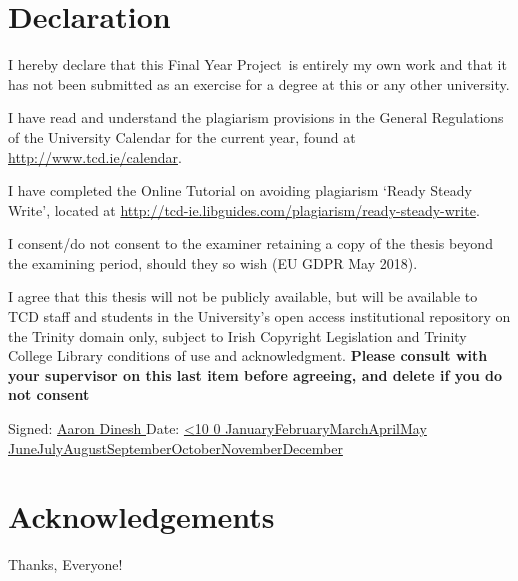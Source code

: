 \documentclass[a4paper,oneside,12pt]{book}
\title{\thesistitle}
\author{\authorname}
\newcommand{\typeofthesis}{Final Year Project} %
\numberwithin{equation}{chapter} %
\renewcommand{\today}{\ifnum\number\day<10 0\fi \number\day \space%
\ifcase \month \or January\or February\or March\or April\or May%
\or June\or July\or August\or September\or October\or November\or December\fi \space%
\number \year}
\begin{document}

\section*{\Huge\textcolor{tcd_blue}{Declaration}}
\vspace{1cm}
I hereby declare that this \typeofthesis\ is entirely my own work and that it has not been submitted as an exercise for
a degree at this or any other university.

\vspace{1cm}
I have read and understand the plagiarism provisions in the General Regulations of the University Calendar for the
current year, found at \url{http://www.tcd.ie/calendar}.
\vspace{1cm}

I have completed the Online Tutorial on avoiding plagiarism `Ready Steady Write', located at
\url{http://tcd-ie.libguides.com/plagiarism/ready-steady-write}.
\vspace{1cm}

I consent/do not consent to the examiner retaining a copy of the thesis beyond the examining period, should they so
wish (EU GDPR May 2018).
\vspace{1cm}

I agree that this thesis will not be publicly available, but will be available to TCD staff and students in the
University’s open access institutional repository on the Trinity domain only, subject to Irish Copyright Legislation and
Trinity College Library conditions of use and acknowledgment.  \textbf{Please consult with your supervisor on this last
item before agreeing, and delete if you do not consent}
\vspace{3cm}

Signed: \uline{\hfill Aaron Dinesh \hfill} Date: \uline{\hfill \today \hfill}



\section*{\Huge\textcolor{tcd_blue}{Acknowledgements}}
Thanks, Everyone!
\newpage

\listoffigures
\tableofcontents
\newpage
\end{document}
